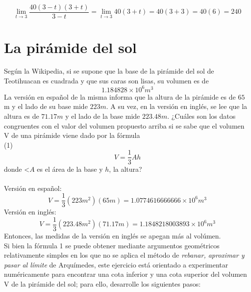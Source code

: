 \documentclass[12pt]{article}
\begin{document}
\[
\lim_{t \to 3 }\frac{40(3-t)(3+t)}{3-t}=\lim_{t \to 3 }40(3+t)=40(3+3)=40(6)=240
\]
\clearpage

\section{La pirámide del sol}
Según la Wikipedia, si se supone que la base de la pirámide del sol de Teotihuacan es cuadrada y que sus caras son lisas, su volumen es de
\[
1.184828 \times 10^6 m^3
\]
La versión en español de la misma informa que la altura de la pirámide es de $65$ m y el lado de su base mide $223 m$. A su vez, en la versión en inglés, se lee que la altura es de $71.17 m$ y el lado de la base mide $223.48 m$. ¿Cuáles son los datos congruentes con el valor del volumen propuesto arriba si se sabe que el volumen V de una pirámide viene dado por la fórmula
\\
(1)\\
\[
V =\frac{1}{3}Ah 
\]
donde <$A$ es el  área de la base y $h$, la altura? \\ \\
Versión en español:
\[
V =\frac{1}{3}(223m^2)(65m)=1.0774616666666 \times 10^6 m^3
\]
Versión en inglés:
\[
V =\frac{1}{3}(223.48m^2)(71.17m)=1.1848218003893 \times 10^6 m^3
\]
Entonces, las medidas de la versión en inglés se apegan más al volúmen.\\

Si bien la fórmula 1 se puede obtener mediante argumentos geométricos relativamente simples en los que no se aplica el método de \textit{rebanar, aproximar y pasar al límite} de Arquímedes, este ejercicio está orientado a experimentar numéricamente para encontrar una cota inferior y una cota superior del volumen V de la pirámide del sol; para ello, desarrolle los siguientes pasos:\\
\end{document}
